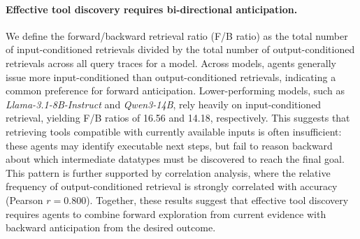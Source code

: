 \paragraph{Effective tool discovery requires bi-directional anticipation.}
We define the forward/backward retrieval ratio (F/B ratio) as the total number of input-conditioned retrievals divided by the total number of output-conditioned retrievals across all query traces for a model. 
Across models, agents generally issue more input-conditioned than output-conditioned retrievals, indicating a common preference for forward anticipation. 
Lower-performing models, such as \textit{Llama-3.1-8B-Instruct} and \textit{Qwen3-14B}, rely heavily on input-conditioned retrieval, yielding F/B ratios of 16.56 and 14.18, respectively. 
This suggests that retrieving tools compatible with currently available inputs is often insufficient: these agents may identify executable next steps, but fail to reason backward about which intermediate datatypes must be discovered to reach the final goal.
This pattern is further supported by correlation analysis, where the relative frequency of output-conditioned retrieval is strongly correlated with accuracy (Pearson $r=0.800$). 
Together, these results suggest that effective tool discovery requires agents to combine forward exploration from current evidence with backward anticipation from the desired outcome.


